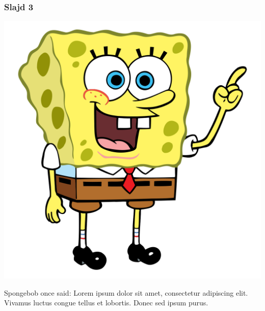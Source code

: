 \documentclass{beamer}
\begin{document}
\begin{frame}
\frametitle{Slajd 3}
\begin{minipage}{0.5\textwidth}
  \includegraphics[width=\linewidth]{sponge.png}
\end{minipage}%
\begin{minipage}{0.5\textwidth}
  Spongebob once said: Lorem ipsum dolor sit amet, consectetur adipiscing elit. Vivamus luctus congue tellus et lobortis. Donec sed ipsum purus. 
\end{minipage}
\end{frame}
\end{document}
